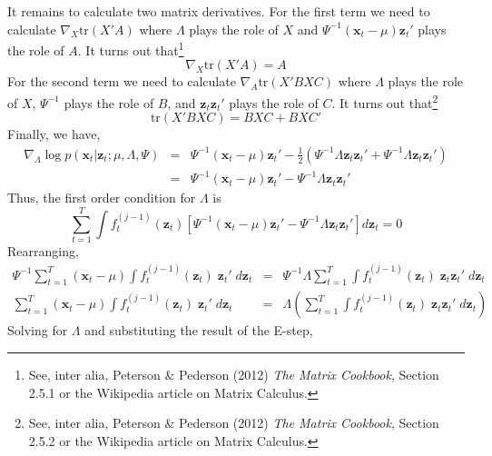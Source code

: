 \documentclass[12pt]{article}
\theoremstyle{definition}
\begin{document}
It remains to calculate two matrix derivatives. For the first term we need to calculate $\nabla_X \mbox{tr}(X'A)$ where $\Lambda$ plays the role of $X$ and $\Psi^{-1}(\mathbf{x}_t - \mu)\mathbf{z}_t'$ plays the role of $A$. It turns out that\footnote{See, inter alia, Peterson \& Pederson (2012) \emph{The Matrix Cookbook}, Section 2.5.1 or the Wikipedia article on Matrix Calculus.} 
	$$\nabla_X \mbox{tr}(X'A)  = A$$
For the second term we need to calculate $\nabla_A \mbox{tr}(X'BXC)$ where $\Lambda$ plays the role of $X$, $\Psi^{-1}$ plays the role of $B$, and $\mathbf{z}_t \mathbf{z}_t'$ plays the role of $C$. It turns out that\footnote{See, inter alia, Peterson \& Pederson (2012) \emph{The Matrix Cookbook}, Section 2.5.2 or the Wikipedia article on Matrix Calculus.}
	$$\mbox{tr}(X'BXC) = BXC + BXC'$$
Finally, we have,
	\begin{eqnarray*}
		\nabla_\Lambda \log p(\textbf{x}_t| \textbf{z}_t;\mu, \Lambda, \Psi) &=& \Psi^{-1} (\textbf{x}_t - \mu)\textbf{z}_t' - \frac{1}{2} \left(\Psi^{-1}\Lambda \textbf{z}_t \textbf{z}_t' +  \Psi^{-1}\Lambda \textbf{z}_t \textbf{z}_t'\right)\\
		&=&\Psi^{-1} (\textbf{x}_t - \mu)\textbf{z}_t' - \Psi^{-1}\Lambda \textbf{z}_t \textbf{z}_t' 
	\end{eqnarray*}
Thus, the first order condition for $\Lambda$ is
$$\sum_{t = 1}^T \int f_t^{(j-1)}(\mathbf{z}_t) \left[ \Psi^{-1} (\textbf{x}_t - \mu)\textbf{z}_t' - \Psi^{-1}\Lambda \textbf{z}_t \textbf{z}_t' \right] d \mathbf{z}_t = 0$$
Rearranging,
	\begin{eqnarray*}
		 \Psi^{-1} \sum_{t = 1}^T  (\textbf{x}_t - \mu)\int f_t^{(j-1)}(\mathbf{z}_t) \; \textbf{z}_t' \; d \mathbf{z}_t &=&  \Psi^{-1} \Lambda \sum_{t=1}^T \int f_t^{(j-1)}(\mathbf{z}_t)\; \textbf{z}_t \textbf{z}_t' \; d \mathbf{z}_t\\
		  \sum_{t = 1}^T  (\textbf{x}_t - \mu)\int f_t^{(j-1)}(\mathbf{z}_t) \; \textbf{z}_t' \; d \mathbf{z}_t &=& \Lambda \left(\sum_{t=1}^T \int f_t^{(j-1)}(\mathbf{z}_t)\; \textbf{z}_t \textbf{z}_t' \; d \mathbf{z}_t\right)
	\end{eqnarray*}
Solving for $\Lambda$ and substituting the result of the E-step,
\end{document}
